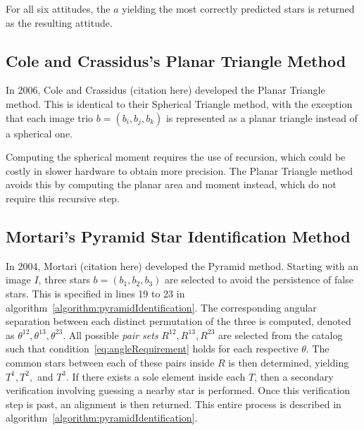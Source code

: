 For all six attitudes, the $a$ yielding the most correctly predicted stars is returned as the resulting attitude.

\subsection{Cole and Crassidus's Planar Triangle Method}\label{subsec:coleAndCrassidus'sPlanarTriangleMethod}
In 2006, Cole and Crassidus (citation here) developed the Planar Triangle method.
This is identical to their Spherical Triangle method, with the exception that each image trio $b = (b_i, b_j, b_k)$
is represented as a planar triangle instead of a spherical one.

Computing the spherical moment requires the use of recursion, which could be costly in slower hardware to obtain more
precision.
The Planar Triangle method avoids this by computing the planar area and moment instead, which do not require this
recursive step.

\subsection{Mortari's Pyramid Star Identification Method}\label{subsec:mortari'sPyramidStarIdentificationMethod}
In 2004, Mortari (citation here) developed the Pyramid method.
Starting with an image $I$, three stars $b = (b_1, b_2, b_3)$ are selected to avoid the persistence of false stars.
This is specified in lines 19 to 23 in algorithm~\ref{algorithm:pyramidIdentification}.
The corresponding angular separation between each distinct permutation of the three is computed, denoted as
$\theta^{12}, \theta^{13}, \theta^{23}$.
All possible \textit{pair sets} $R^{12}, R^{13}, R^{23}$ are selected from the catalog such that
condition~\eqref{eq:angleRequirement} holds for each respective $\theta$.
The common stars between each of these pairs inside $R$ is then determined, yielding $T^1, T^2, $ and $T^3$.
If there exists a sole element inside each $T$, then a secondary verification involving guessing a nearby star is
performed.
Once this verification step is past, an alignment is then returned.
This entire process is described in algorithm~\ref{algorithm:pyramidIdentification}.

